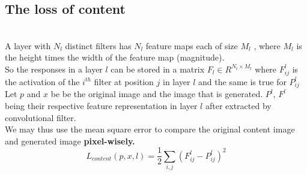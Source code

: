 \documentclass[11pt, a4paper]{article} %
\begin{document}
\subsection{The loss of content}
\\ A layer with $N_{l}$ distinct filters has $N_{l}$ feature maps each of size $M_{l}$
, where $M_{l}$ is the height times the width of the feature map (magnitude).
\\ So the responses in a layer $l$ can be stored in a matrix $F_{l} \in R^{N_l \times M_l}$ where $F^{l}_{ij}$ is the activation of the $i^{th}$ filter at position $j$ in layer $l$ and the same is true for $P^l_{ij}$ 
\\ Let $p$ and $x$ be be the original image and the image that is generated. $P^{l}$, $F^{l}$ being their respective feature representation in layer $l$ after extracted by convolutional filter.
\\ We may thus use the mean square error to compare the original content image and generated image \textbf{pixel-wisely.}
\\ {\Large $$L_{content}(p, x, l) = \frac{1}{2} \sum_{i, j}(F^{l}_{ij} - P^l_{ij})^2$$}
\end{document}
